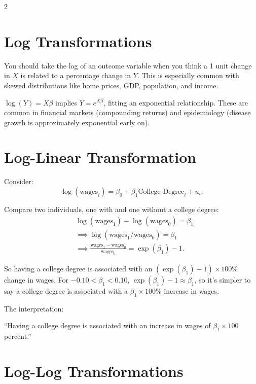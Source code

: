 \documentclass[12pt]{article}
\begin{document}
\begin{multicols}{2}
  \section*{Log Transformations}

  You should take the log of an outcome variable when you think a 1 unit change in $X$ is related to a percentage change in $Y$. This is especially common with skewed distributions like home prices, GDP, population, and income.

  $\log(Y) = X\beta$ implies $Y = e^{X\beta}$, fitting an exponential relationship. These are common in financial markets (compounding returns) and epidemiology (disease growth is approximately exponential early on).

  \section*{Log-Linear Transformation}

  Consider:
  $$\log(\text{wages}_i) = \beta_0 + \beta_1 \text{College Degree}_i + u_i.$$

  Compare two individuals, one with and one without a college degree:
  \begin{align*}
    &\log(\text{wages}_1) - \log(\text{wages}_0)                     = \beta_1 \\
    &\implies \log(\text{wages}_1 / \text{wages}_0)                  = \beta_1 \\
    &\implies \frac{\text{wages}_1 - \text{wages}_0}{\text{wages}_0} = \exp(\beta_1) - 1.
  \end{align*}

  So having a college degree is associated with an $(\exp(\beta_1) - 1) \times 100\%$ change in wages. For $-0.10 < \beta_1 < 0.10$, $\exp(\beta_1) - 1 \approx \beta_1$, so it's simpler to say a college degree is associated with a $\beta_1 \times 100\%$ increase in wages.

  The interpretation:

    ``Having a college degree is associated with an increase in wages of $\beta_1 \times 100$ percent.''

  \section*{Log-Log Transformations}


\end{multicols}
\end{document}

